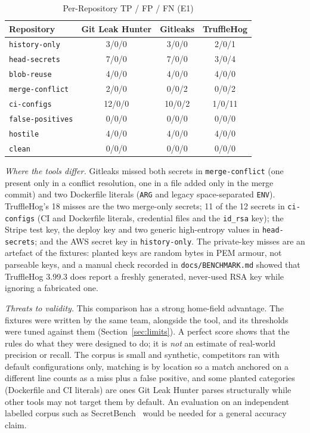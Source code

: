 \documentclass[conference]{IEEEtran}
\newcommand{\tool}{Git Leak Hunter}
\newcommand{\code}[1]{\texttt{#1}}
\begin{document}
\begin{table}[t]
\centering
\caption{Per-Repository TP / FP / FN (E1)}
\label{tab:perrepo}
\footnotesize
\setlength{\tabcolsep}{4pt}
\begin{tabular}{@{}lccc@{}}
\toprule
Repository & \tool{} & Gitleaks & TruffleHog \\
\midrule
\code{history-only} & 3/0/0 & 3/0/0 & 2/0/1 \\
\code{head-secrets} & 7/0/0 & 7/0/0 & 3/0/4 \\
\code{blob-reuse} & 4/0/0 & 4/0/0 & 4/0/0 \\
\code{merge-conflict} & 2/0/0 & 0/0/2 & 0/0/2 \\
\code{ci-configs} & 12/0/0 & 10/0/2 & 1/0/11 \\
\code{false-positives} & 0/0/0 & 0/0/0 & 0/0/0 \\
\code{hostile} & 4/0/0 & 4/0/0 & 4/0/0 \\
\code{clean} & 0/0/0 & 0/0/0 & 0/0/0 \\
\bottomrule
\end{tabular}
\end{table}

\emph{Where the tools differ.} Gitleaks missed both secrets in \code{merge-conflict} (one present
only in a conflict resolution, one in a file added only in the merge commit) and two Dockerfile
literals (\code{ARG} and legacy space-separated \code{ENV}). TruffleHog's 18 misses are the two merge-only
secrets; 11 of the 12 secrets in \code{ci-configs} (CI and Dockerfile literals, credential files
and the \code{id\_rsa} key); the Stripe test key, the deploy key and two generic high-entropy
values in \code{head-secrets}; and the AWS secret key in \code{history-only}. The private-key
misses are an artefact of the fixtures: planted keys are random bytes in PEM armour, not
parseable keys, and a manual check recorded in \code{docs/BENCHMARK.md} showed that TruffleHog
3.99.3 does report a freshly generated, never-used RSA key while ignoring a fabricated one.

\emph{Threats to validity.} This comparison has a strong home-field advantage. The fixtures were
written by the same team, alongside the tool, and its thresholds were tuned against them
(Section~\ref{sec:limits}). A perfect score shows that the rules do what they were designed to do;
it is \emph{not} an estimate of real-world precision or recall. The corpus is small and synthetic,
competitors ran with default configurations only, matching is by location so a match anchored on
a different line counts as a miss plus a false positive, and some planted categories (Dockerfile
and CI literals) are ones \tool{} parses structurally while other tools may not target them by
default. An evaluation on an independent labelled corpus such as SecretBench~\cite{secretbench}
would be needed for a general accuracy claim.
\end{document}
